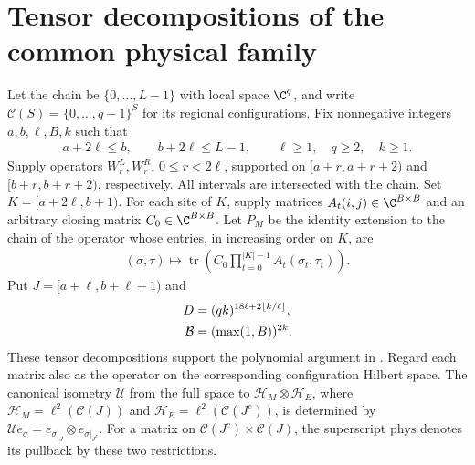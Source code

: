 \section{Tensor decompositions of the common physical family}

Let the chain be $\{0,\ldots,L-1\}$ with local space $\C^q$, and write
$\mathcal C(S)=\{0,\ldots,q-1\}^S$ for its regional configurations.
Fix nonnegative integers $a,b,\ell,B,k$ such that
\begin{align}
    a+2\ell\le b,\qquad b+2\ell\le L-1,\qquad
    \ell\ge1,\quad q\ge2,\quad k\ge1.
    \label{eq:physical_tensor_hypotheses}
\end{align}
Supply operators $W^L_r,W^R_r$, $0\le r<2\ell$, supported on
$\lbrack a+r,a+r+2)$ and $\lbrack b+r,b+r+2)$, respectively.
All intervals are intersected with the chain. Set $K=\lbrack a+2\ell,b+1)$.
For each site of $K$, supply matrices $A_t(i,j)\in\C^{B\times B}$ and an
arbitrary closing matrix $C_0\in\C^{B\times B}$. Let $P_M$ be the identity
extension to the chain of the operator whose entries, in increasing order
on $K$, are
\begin{align}
    (\sigma,\tau)\longmapsto
    \operatorname{tr}\left(C_0\prod_{t=0}^{|K|-1}A_t(\sigma_t,\tau_t)\right).
    \label{eq:physical_tensor_core}
\end{align}
Put $J=\lbrack a+\ell,b+\ell+1)$ and
\begin{align}
    D          & =(qk)^{18\ell+2\lfloor k/\ell\rfloor},\notag \\
    \mathcal B & =(\max(1,B))^{2k}.
    \label{eq:physical_tensor_bounds}
\end{align}
These tensor decompositions support the polynomial argument in
\cite[Proposition~5.7]{Arad2016RigorousRG}.
Regard each matrix also as the operator on the corresponding configuration
Hilbert space. The canonical isometry $\mathcal U$ from the full space to
$\mathcal H_M\otimes\mathcal H_E$, where
$\mathcal H_M=\ell^2(\mathcal C(J))$ and
$\mathcal H_E=\ell^2(\mathcal C(J^c))$, is determined by
$\mathcal U e_\sigma=e_{\sigma|_J}\otimes e_{\sigma|_{J^c}}$.
For a matrix on $\mathcal C(J^c)\times\mathcal C(J)$, the superscript
$\mathrm{phys}$ denotes its pullback by these two restrictions.

